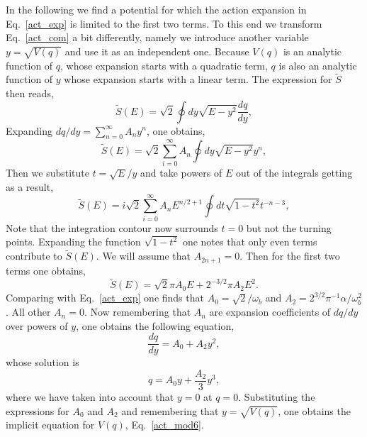 \documentclass[journal=jpcafh,manuscript=article]{achemso}
\begin{document}
In the following we find a potential for which the action expansion in
Eq.~\ref{act_exp} is limited to the first two terms.  To this end we
transform Eq.~\ref{act_com} a bit differently, namely we introduce
another variable $y=\sqrt{V(q)}$ and use it as an independent
one. Because $V(q)$ is an analytic function of $q$, whose expansion
starts with a quadratic term, $q$ is also an analytic function of $y$
whose expansion starts with a linear term. The expression for
$\tilde{S}$ then reads,
\begin{equation}
  \label{act_mod}
\tilde{S}(E)=\sqrt{2}\oint dy\sqrt{E-y^2}\frac{dq}{dy},  
\end{equation}
Expanding $dq/dy=\sum_{n=0}^{\infty}A_ny^n$, one obtains,
\begin{equation}
  \label{act_mod1}
\tilde{S}(E)=\sqrt{2}\sum_{i=0}^{\infty}A_n\oint dy\sqrt{E-y^2}y^n,  
\end{equation}
Then we substitute $t=\sqrt{E}/y$ and take powers of $E$ out of the
integrals getting as a result,
\begin{equation}
  \label{act_mod2}
\tilde{S}(E)=i\sqrt{2}\sum_{i=0}^{\infty}A_nE^{n/2+1}\oint dt\sqrt{1-t^2}t^{-n-3},  
\end{equation}
Note that the integration contour now surrounds $t=0$ but not the
turning points. Expanding the function $\sqrt{1-t^2}$ one notes that
only even terms contribute to $\tilde{S}(E)$. We will assume that
$A_{2n+1}=0$. Then for the first two terms one obtains,
\begin{equation}
  \label{act_mod3}
  \tilde{S}(E)=\sqrt{2}\pi A_0E +2^{-3/2}\pi A_2E^2.
\end{equation}
Comparing with Eq.~\ref{act_exp} one finds that
$A_0=\sqrt{2}/\omega_b$ and $A_2=2^{3/2}\pi^{-1}\alpha/\omega_b^2$.
All other $A_n=0$. Now remembering that $A_n$ are expansion coefficients of
$dq/dy$ over powers of $y$, one obtains the following equation,
\begin{equation}
  \label{act_mod4}
  \frac{dq}{dy}=A_0+A_2y^2,
\end{equation}
whose solution is
\begin{equation}
  \label{act_mod5}
  q=A_0y+\frac{A_2}{3}y^3,
\end{equation}
where we have taken into account that $y=0$ at $q=0$. Substituting the
expressions for $A_0$ and $A_2$ and remembering that $y=\sqrt{V(q)}$,
one obtains the implicit equation for $V(q)$, Eq.~\ref{act_mod6}.

\setcounter{equation}{0}
\end{document}
